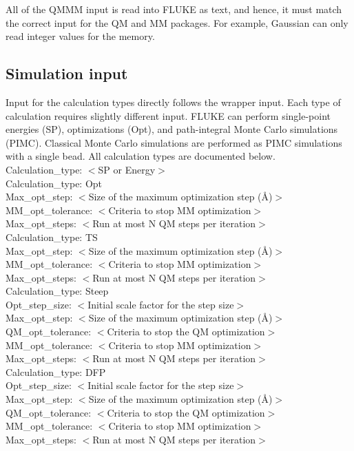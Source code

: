 \documentclass[12pt]{report}
\begin{document}
All of the QMMM input is read into FLUKE as text, and hence, it must match the
correct input for the QM and MM packages. For example, Gaussian can only read
integer values for the memory.

\subsection{Simulation input}

Input for the calculation types directly follows the wrapper input. Each type
of calculation requires slightly different input. FLUKE can perform
single-point energies (SP), optimizations (Opt), and path-integral Monte Carlo
simulations (PIMC). Classical Monte Carlo simulations are performed as PIMC
simulations with a single bead. All calculation types are documented below. \\

Calculation\_type: $<$SP or Energy$>$ \\

Calculation\_type: Opt \\
Max\_opt\_step: $<$Size of the maximum optimization step (\AA)$>$ \\
MM\_opt\_tolerance: $<$Criteria to stop MM optimization$>$ \\
Max\_opt\_steps: $<$Run at most N QM steps per iteration$>$ \\

Calculation\_type: TS \\
Max\_opt\_step: $<$Size of the maximum optimization step (\AA)$>$ \\
MM\_opt\_tolerance: $<$Criteria to stop MM optimization$>$ \\
Max\_opt\_steps: $<$Run at most N QM steps per iteration$>$ \\

Calculation\_type: Steep \\
Opt\_step\_size: $<$Initial scale factor for the step size$>$ \\
Max\_opt\_step: $<$Size of the maximum optimization step (\AA)$>$
QM\_opt\_tolerance: $<$Criteria to stop the QM optimization$>$\\
MM\_opt\_tolerance: $<$Criteria to stop MM optimization$>$ \\
Max\_opt\_steps: $<$Run at most N QM steps per iteration$>$ \\

Calculation\_type: DFP \\
Opt\_step\_size: $<$Initial scale factor for the step size$>$ \\
Max\_opt\_step: $<$Size of the maximum optimization step (\AA)$>$
QM\_opt\_tolerance: $<$Criteria to stop the QM optimization$>$\\
MM\_opt\_tolerance: $<$Criteria to stop MM optimization$>$ \\
Max\_opt\_steps: $<$Run at most N QM steps per iteration$>$ \\
\end{document}
